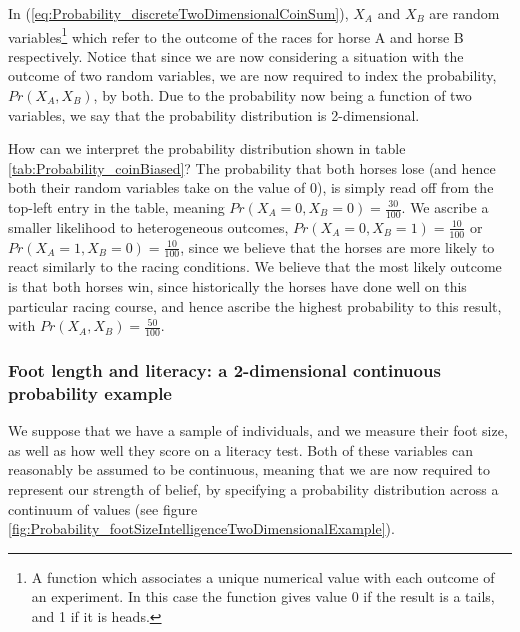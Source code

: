 \documentclass[11pt,fullpage]{book}
\begin{document}
In (\ref{eq:Probability_discreteTwoDimensionalCoinSum}), $X_A$ and $X_B$ are random variables\footnote{A function which associates a unique numerical value with each outcome of an experiment. In this case the function gives value 0 if the result is a tails, and 1 if it is heads.} which refer to the outcome of the races for horse A and horse B respectively. Notice that since we are now considering a situation with the outcome of two random variables, we are now required to index the probability, $Pr(X_A,X_B)$, by both. Due to the probability now being a function of two variables, we say that the probability distribution is 2-dimensional.

How can we interpret the probability distribution shown in table \ref{tab:Probability_coinBiased}? The probability that both horses lose (and hence both their random variables take on the value of 0), is simply read off from the top-left entry in the table, meaning $Pr(X_A=0,X_B=0)=\frac{30}{100}$. We ascribe a smaller likelihood to heterogeneous outcomes, $Pr(X_A=0,X_B=1)=\frac{10}{100}$ or $Pr(X_A=1,X_B=0)=\frac{10}{100}$, since we believe that the horses are more likely to react similarly to the racing conditions. We believe that the most likely outcome is that both horses win, since historically the horses have done well on this particular racing course, and hence ascribe the highest probability to this result, with $Pr(X_A,X_B)=\frac{50}{100}$.

\subsubsection{Foot length and literacy: a 2-dimensional continuous probability example}
We suppose that we have a sample of individuals, and we measure their foot size, as well as how well they score on a literacy test. Both of these variables can reasonably be assumed to be continuous, meaning that we are now required to represent our strength of belief, by specifying a probability distribution across a continuum of values (see figure \ref{fig:Probability_footSizeIntelligenceTwoDimensionalExample}). 
\end{document}
